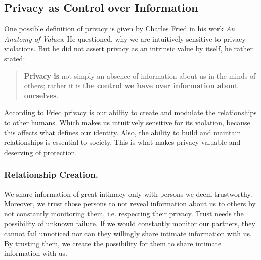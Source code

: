 \documentclass[runningheads,a4paper]{llncs}
\begin{document}
\subsection{Privacy as Control over Information}

One possible definition of privacy is given by Charles Fried in his work \textit{An Anatomy of Values}\cite{CFried:Privacy}.
He questioned, why we are intuitively sensitive to privacy violations.
But he did not assert privacy as an intrinsic value by itself, he rather stated:
\begin{quote}
\textbf{Privacy is} not simply an absence of information about us in the minds of others;
rather it is \textbf{the control we have over information about ourselves}. \cite{CFried:Privacy}
\end{quote}
According to Fried privacy is our ability to create and modulate the relationships to other humans.
Which makes us intuitively sensitive for its violation, because this affects what defines our identity.
Also, the ability to build and maintain relationships is essential to society.
This is what makes privacy valuable and deserving of protection. 
\cite{sep-privacy}\cite{CFried:Privacy}

\subsubsection{Relationship Creation.}


We share information of great intimacy only with persons we deem trustworthy. 
Moreover, we trust those persons to not reveal information about us to others by not constantly monitoring them, i.e. respecting their privacy.
Trust needs the possibility of unknown failure.
If we would constantly monitor our partners, they cannot fail unnoticed nor can they willingly share intimate information with us.
By trusting them, we create the possibility for them to share intimate information with us.
\cite{CFried:Privacy}
\end{document}
